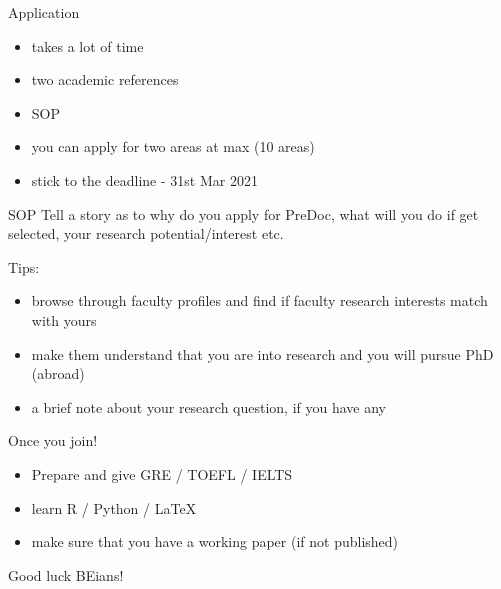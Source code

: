 \documentclass[
  ignorenonframetext,
]{beamer}
\begin{document}
\begin{frame}{Application}
    \begin{itemize}
        \item takes a lot of time
        \item two academic references
        \item SOP
        \item you can apply for two areas at max (10 areas)
        \item stick to the deadline - 31st Mar 2021
    \end{itemize}
\end{frame}

\begin{frame}{SOP}
Tell a story as to why do you apply for PreDoc, what will you do if get selected, your research potential/interest etc.

Tips:
\begin{itemize}
    \item browse through faculty profiles and find if faculty research interests match with yours
    \item make them understand that you are into research and you will pursue PhD (abroad)
    \item a brief note about your research question, if you have any
\end{itemize}
    
\end{frame}

\begin{frame}{Once you join!}
\begin{itemize}
    \item Prepare and give GRE / TOEFL / IELTS
    \item learn R / Python / LaTeX
    \item make sure that you have a working paper (if not published)
\end{itemize}
    
\end{frame}

\begin{frame}{}

\centering
Good luck BEians!
    
\end{frame}
\end{document}
